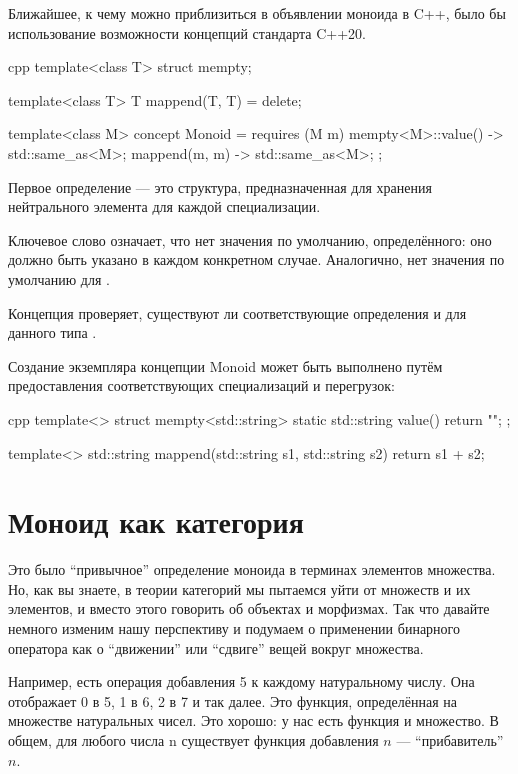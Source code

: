 Ближайшее, к чему можно приблизиться в объявлении моноида в C++, было бы использование
возможности концепций стандарта C++20.

\begin{snip}{cpp}
template<class T>
struct mempty;

template<class T>
T mappend(T, T) = delete;

template<class M>
concept Monoid = requires (M m) {
    { mempty<M>::value() } -> std::same_as<M>;
    { mappend(m, m) } -> std::same_as<M>;
};
\end{snip}
Первое определение --- это структура, предназначенная для хранения нейтрального элемента для каждой
специализации.

Ключевое слово  означает, что нет значения по умолчанию,
определённого: оно должно быть указано в каждом конкретном случае.
Аналогично, нет значения по умолчанию для .

Концепция  проверяет, существуют ли соответствующие определения
 и  для данного типа .

Создание экземпляра концепции Monoid может быть выполнено путём предоставления
соответствующих специализаций и перегрузок:

\begin{snip}{cpp}
template<>
struct mempty<std::string> {
    static std::string value() { return ""; }
};

template<>
std::string mappend(std::string s1, std::string s2) {
    return s1 + s2;
}
\end{snip}

\section{Моноид как категория}

Это было ``привычное'' определение моноида в терминах элементов
множества. Но, как вы знаете, в теории категорий мы пытаемся уйти от
множеств и их элементов, и вместо этого говорить об объектах и морфизмах.
Так что давайте немного изменим нашу перспективу и подумаем о применении
бинарного оператора как о ``движении'' или ``сдвиге'' вещей вокруг множества.

Например, есть операция добавления 5 к каждому натуральному
числу. Она отображает 0 в 5, 1 в 6, 2 в 7 и так далее. Это функция,
определённая на множестве натуральных чисел. Это хорошо: у нас есть функция
и множество. В общем, для любого числа n существует функция добавления $n$
--- ``прибавитель'' $n$.

